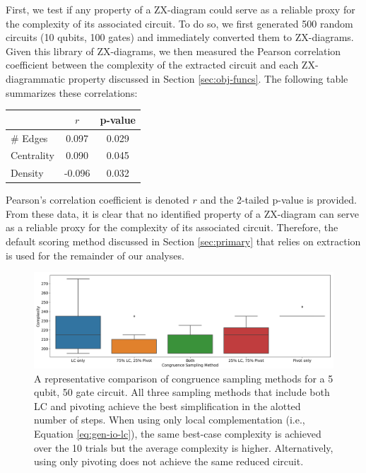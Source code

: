 First, we test if any property of a ZX-diagram could serve as a reliable proxy for the complexity of its associated circuit.
To do so, we first generated 500 random circuits (10 qubits, 100 gates) and immediately converted them to ZX-diagrams.
Given this library of ZX-diagrams, we then measured the Pearson correlation coefficient between the complexity of the extracted circuit and each ZX-diagrammatic property discussed in Section \ref{sec:obj-funcs}.
The following table summarizes these correlations:
\begin{center}
\begin{tabular}[]{@{}lcc@{}}
\toprule
                    & $r$ & p-value \\ \midrule
\# Edges  & 0.097        & 0.029            \\
Centrality & 0.090        & 0.045            \\
Density    & -0.096       & 0.032            \\ \bottomrule
\end{tabular}
\end{center}
Pearson's correlation coefficient is denoted $r$ and the 2-tailed p-value is provided.
From these data, it is clear that no identified property of a ZX-diagram can serve as a reliable proxy for the complexity of its associated circuit.
Therefore, the default scoring method discussed in Section \ref{sec:primary} that relies on extraction is used for the remainder of our analyses.



\begin{figure}[t]
\centering
\includegraphics[width=13cm]{img/cong-sampling-ex.png}
\caption{
  A representative comparison of congruence sampling methods for a 5 qubit, 50 gate circuit.
  All three sampling methods that include both LC and pivoting achieve the best simplification in the alotted number of steps.
  When using only local complementation (i.e., Equation \ref{eq:gen-io-lc}), the same best-case complexity is achieved over the 10 trials but the average complexity is higher.
  Alternatively, using only pivoting does not achieve the same reduced circuit.
}
\label{fig:cong-sampling}
\end{figure}

